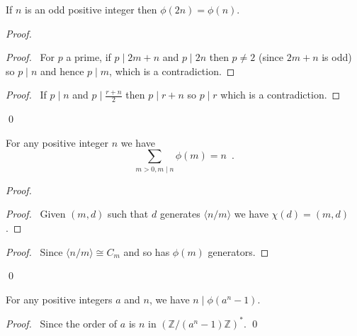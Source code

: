 \begin{prop}
    If $n$ is an odd positive integer then $\phi(2n) = \phi(n)$.
\end{prop}

\begin{proof}
    \pf
    \begin{proof}
        \pf\ For $p$ a prime, if $p \mid 2m+n$ and $p \mid 2n$ then $p \neq 2$ (since $2m+n$ is odd) so $p \mid n$ and hence $p \mid m$, which is a contradiction.
    \end{proof}
    \begin{proof}
        \pf\ If $p \mid n$ and $p \mid \frac{r + n}{2}$ then $p \mid r + n$ so $p \mid r$ which is a contradiction.
    \end{proof}
    \qed
\end{proof}

\begin{thm}
For any positive integer $n$ we have
\[ \sum_{m > 0, m \mid n} \phi(m) = n \enspace . \]
\end{thm}

\begin{proof}
\pf
{}
\begin{proof}
\pf\ Given $(m,d)$ such that $d$ generates $\langle n/m \rangle$ we have $\chi(d) = (m,d)$.
\end{proof}
\begin{proof}
\pf\ Since $\langle n/m \rangle \cong C_m$ and so has $\phi(m)$ generators.
\end{proof}
\qed
\end{proof}

\begin{prop}
For any positive integers $a$ and $n$, we have $n \mid \phi(a^n - 1)$.
\end{prop}

\begin{proof}
\pf\ Since the order of $a$ is $n$ in $(\mathbb{Z} / (a^n - 1)\mathbb{Z})^*$. \qed
\end{proof}

